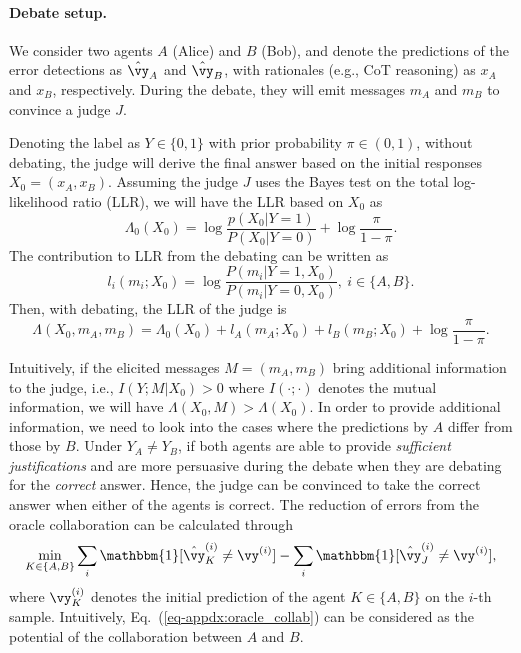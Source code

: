 \documentclass{article} %
\begin{document}
\paragraph{Debate setup.} 
We consider two agents $A$ (Alice) and $B$ (Bob), and denote the predictions of the error detections as $\hat{\vy}_A$ and $\hat{\vy}_B$, with rationales (e.g., CoT reasoning) as $x_A$ and $x_B$, respectively. During the debate, they will emit messages $m_A$ and $m_B$ to convince a judge $J$. 
\begin{assumption}
Denoting the label as $Y\in\{0,1\}$ with prior probability $\pi\in(0,1)$, without debating, the judge will derive the final answer based on the initial responses $X_0=(x_A,x_B)$. Assuming the judge $J$ uses the Bayes test on the total log-likelihood ratio (LLR), we will have the LLR based on $X_0$ as
\begin{equation}\label{eq-appdx:llr_x0}
    \Lambda_0(X_0)=\log\frac{p(X_0|Y=1)}{P(X_0|Y=0)}+\log\frac{\pi}{1-\pi}.
\end{equation}
The contribution to LLR from the debating can be written as
\begin{equation}\label{eq-appdx:llr_contrib}
    l_i(m_i;X_0)=\log\frac{P(m_i|Y=1,X_0)}{P(m_i|Y=0,X_0)},\ i\in\{A,B\}.
\end{equation}
Then, with debating, the LLR of the judge is
\begin{equation}\label{eq-appdx:llr_debating}
\Lambda(X_0,m_A,m_B)=\Lambda_0(X_0)+l_A(m_A;X_0)+l_B(m_B;X_0)+\log\frac{\pi}{1-\pi}.
\end{equation}
\end{assumption}

Intuitively, if the elicited messages $M=(m_A,m_B)$ bring additional information to the judge, i.e., $I(Y;M|X_0)>0$ where $I(\cdot;\cdot)$ denotes the mutual information, we will have $\Lambda(X_0,M)>\Lambda(X_0)$. 
In order to provide additional information, we need to look into the cases where the predictions by $A$ differ from those by $B$. Under $Y_A\neq Y_B$, if both agents are able to provide \textit{sufficient justifications} and are more persuasive during the debate when they are debating for the \textit{correct} answer. Hence, the judge can be convinced to take the correct answer when either of the agents is correct.
The reduction of errors from the oracle collaboration can be calculated through
\begin{equation}\label{eq-appdx:oracle_collab}
    \min_{K\in\{A,B\}}\sum_{i}\mathbbm{1}[\hat{\vy}_K^{(i)}\neq\vy^{(i)}]-\sum_{i}\mathbbm{1}[\hat{\vy}_J^{(i)}\neq\vy^{(i)}],
\end{equation}
where $\vy^{(i)}_K$ denotes the initial prediction of the agent $K\in\{A,B\}$ on the $i$-th sample. Intuitively, Eq.~(\ref{eq-appdx:oracle_collab}) can be considered as the potential of the collaboration between $A$ and $B$.
\end{document}
